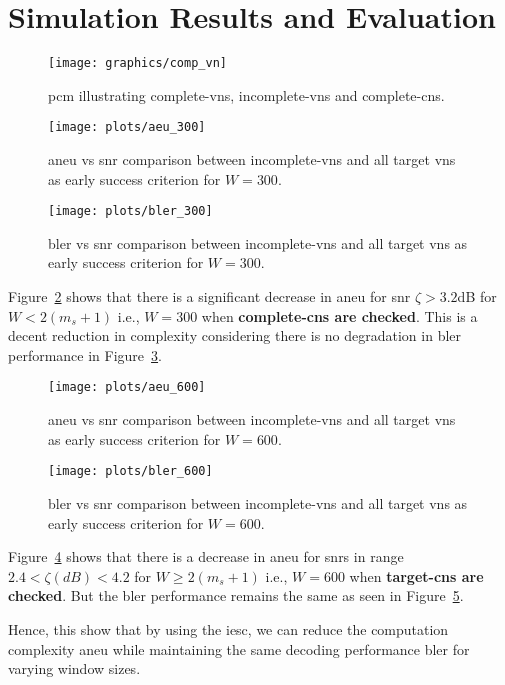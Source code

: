 \section{Simulation Results and Evaluation}\label{ch:simulation}
\begin{figure}[htbp]
  \centering
  \texttt{[image: graphics/comp\_vn]}
  \caption{\ac{pcm} illustrating complete-\acp{vn}, incomplete-\acp{vn} and complete-\acp{cn}.}
  \label{fig:comp_vn}
\end{figure}

\begin{figure}[htbp]
  \centering
  \texttt{[image: plots/aeu\_300]}
  \caption{\ac{aneu} vs \ac{snr} comparison between incomplete-\acp{vn} and all target \acp{vn} as early success criterion for $W=300$.}
  \label{fig:aneu_vs_snr_300}
\end{figure}

\begin{figure}[htbp]
  \centering
  \texttt{[image: plots/bler\_300]}
  \caption{\ac{bler} vs \ac{snr} comparison between incomplete-\acp{vn} and all target \acp{vn} as early success criterion for $W=300$.}
  \label{fig:bler_vs_snr_300}
\end{figure}

Figure~\ref{fig:aneu_vs_snr_300} shows that there is a significant decrease in \ac{aneu} for \ac{snr} $\zeta>3.2$dB for $W<2(m_s+1)$ i.e., $W=300$ when \textbf{complete-\acp{cn} are checked}. This is a decent reduction in complexity considering there is no degradation in \ac{bler} performance in Figure~\ref{fig:bler_vs_snr_300}.

\begin{figure}[htbp]
  \centering
  \texttt{[image: plots/aeu\_600]}
  \caption{\ac{aneu} vs \ac{snr} comparison between incomplete-\acp{vn} and all target \acp{vn} as early success criterion for $W=600$.}
  \label{fig:aneu_vs_snr_600}
\end{figure}

\begin{figure}[htbp]
  \centering
  \texttt{[image: plots/bler\_600]}
  \caption{\ac{bler} vs \ac{snr} comparison between incomplete-\acp{vn} and all target \acp{vn} as early success criterion for $W=600$.}
  \label{fig:bler_vs_snr_600}
\end{figure}

Figure~\ref{fig:aneu_vs_snr_600} shows that there is a decrease in \ac{aneu} for \acp{snr} in range $2.4<\zeta(dB)<4.2$ for $W\geq2(m_s+1)$ i.e., $W=600$ when \textbf{target-\acp{cn} are checked}. But the \ac{bler} performance remains the same as seen in Figure~\ref{fig:bler_vs_snr_600}.

Hence, this show that by using the \ac{iesc}, we can reduce the computation complexity \ac{aneu} while maintaining the same  decoding performance \ac{bler} for varying window sizes.